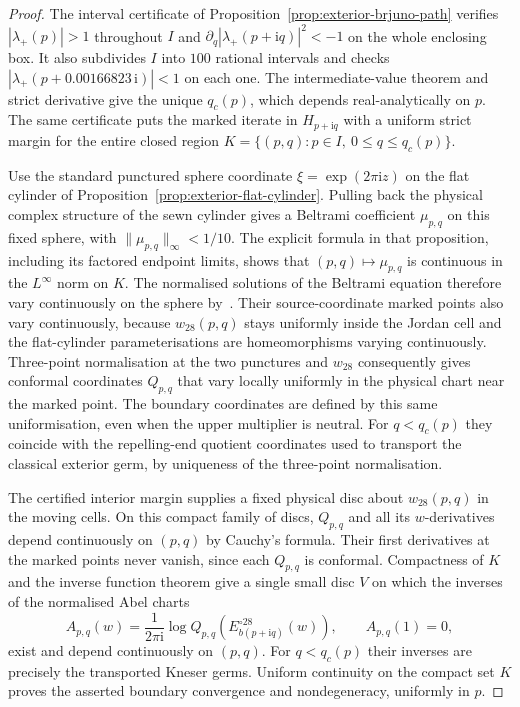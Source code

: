 \documentclass[11pt,a4paper]{article}
\theoremstyle{definition}
\newcommand{\ii}{\mathrm{i}}
\begin{document}
\begin{proof}
The interval certificate of
Proposition~\ref{prop:exterior-brjuno-path} verifies
$|\lambda_+(p)|>1$ throughout $I$ and
$\partial_q|\lambda_+(p+\ii q)|^2<-1$ on the whole enclosing box.
It also subdivides $I$ into $100$ rational intervals and checks
$|\lambda_+(p+0.00166823\,\ii)|<1$ on each one.
The intermediate-value theorem and strict derivative give the
unique $q_c(p)$, which depends real-analytically on $p$.
The same certificate puts the marked iterate in $H_{p+\ii q}$
with a uniform strict margin for the entire closed region
$K=\{(p,q):p\in I,\ 0\le q\le q_c(p)\}$.

Use the standard punctured sphere coordinate
$\xi=\exp(2\pi\ii z)$ on the flat cylinder of
Proposition~\ref{prop:exterior-flat-cylinder}.  Pulling back the
physical complex structure of the sewn cylinder gives a Beltrami
coefficient $\mu_{p,q}$ on this fixed sphere, with
$\|\mu_{p,q}\|_\infty<1/10$.  The explicit formula in that
proposition, including its factored endpoint limits, shows that
$(p,q)\mapsto\mu_{p,q}$ is continuous in the $L^\infty$ norm on
$K$.  The normalised solutions of the Beltrami equation therefore
vary continuously on the sphere by~\cite[Thm.~8]{AhlforsBers1960}.
Their source-coordinate marked points also vary continuously,
because $w_{28}(p,q)$ stays uniformly inside the Jordan cell and the
flat-cylinder parameterisations are homeomorphisms varying
continuously.  Three-point normalisation at the two punctures and
$w_{28}$ consequently gives conformal coordinates $Q_{p,q}$ that
vary locally uniformly in the physical chart near the marked point.
The boundary coordinates are defined by this same uniformisation,
even when the upper multiplier is neutral.  For $q<q_c(p)$ they
coincide with the repelling-end quotient coordinates used to
transport the classical exterior germ, by uniqueness of the
three-point normalisation.

The certified interior margin supplies a fixed physical disc about
$w_{28}(p,q)$ in the moving cells.  On this compact family of discs,
$Q_{p,q}$ and all its $w$-derivatives depend continuously on
$(p,q)$ by Cauchy's formula.  Their first derivatives at the marked
points never vanish, since each $Q_{p,q}$ is conformal.
Compactness of $K$ and the inverse function theorem give a single
small disc $V$ on which the inverses of the normalised Abel charts
\[
 A_{p,q}(w)=\frac{1}{2\pi\ii}
       \log Q_{p,q}(E_{b(p+\ii q)}^{\circ28}(w)),
 \qquad A_{p,q}(1)=0,
\]
exist and depend continuously on $(p,q)$.  For $q<q_c(p)$ their
inverses are precisely the transported Kneser germs.  Uniform
continuity on the compact set $K$ proves the asserted boundary
convergence and nondegeneracy, uniformly in $p$.
\end{proof}
\end{document}
